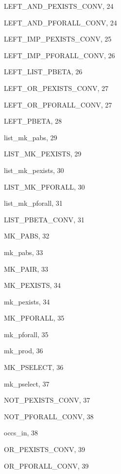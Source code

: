 \begin{theindex}
  \indexspace

  \item {\ptt LEFT\_AND\_PEXISTS\_CONV}, 24
  \item {\ptt LEFT\_AND\_PFORALL\_CONV}, 24
  \item {\ptt LEFT\_IMP\_PEXISTS\_CONV}, 25
  \item {\ptt LEFT\_IMP\_PFORALL\_CONV}, 26
  \item {\ptt LEFT\_LIST\_PBETA}, 26
  \item {\ptt LEFT\_OR\_PEXISTS\_CONV}, 27
  \item {\ptt LEFT\_OR\_PFORALL\_CONV}, 27
  \item {\ptt LEFT\_PBETA}, 28
  \item {\ptt list\_mk\_pabs}, 29
  \item {\ptt LIST\_MK\_PEXISTS}, 29
  \item {\ptt list\_mk\_pexists}, 30
  \item {\ptt LIST\_MK\_PFORALL}, 30
  \item {\ptt list\_mk\_pforall}, 31
  \item {\ptt LIST\_PBETA\_CONV}, 31

  \indexspace

  \item {\ptt MK\_PABS}, 32
  \item {\ptt mk\_pabs}, 33
  \item {\ptt MK\_PAIR}, 33
  \item {\ptt MK\_PEXISTS}, 34
  \item {\ptt mk\_pexists}, 34
  \item {\ptt MK\_PFORALL}, 35
  \item {\ptt mk\_pforall}, 35
  \item {\ptt mk\_prod}, 36
  \item {\ptt MK\_PSELECT}, 36
  \item {\ptt mk\_pselect}, 37

  \indexspace

  \item {\ptt NOT\_PEXISTS\_CONV}, 37
  \item {\ptt NOT\_PFORALL\_CONV}, 38

  \indexspace

  \item {\ptt occs\_in}, 38
  \item {\ptt OR\_PEXISTS\_CONV}, 39
  \item {\ptt OR\_PFORALL\_CONV}, 39

  \indexspace


\end{theindex}
